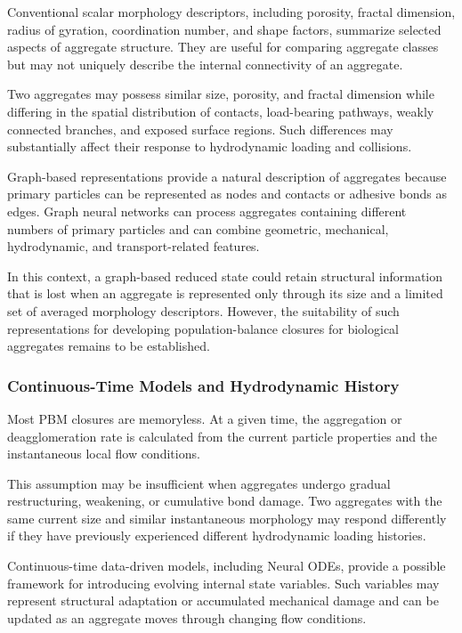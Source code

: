 \documentclass[11pt,a4paper,twoside]{scrartcl}
\begin{document}
Conventional scalar morphology descriptors, including porosity, fractal dimension, radius of gyration, coordination number, and shape factors, summarize selected aspects of aggregate structure. They are useful for comparing aggregate classes but may not uniquely describe the internal connectivity of an aggregate.

Two aggregates may possess similar size, porosity, and fractal dimension while differing in the spatial distribution of contacts, load-bearing pathways, weakly connected branches, and exposed surface regions. Such differences may substantially affect their response to hydrodynamic loading and collisions.

Graph-based representations provide a natural description of aggregates because primary particles can be represented as nodes and contacts or adhesive bonds as edges. Graph neural networks can process aggregates containing different numbers of primary particles and can combine geometric, mechanical, hydrodynamic, and transport-related features.

In this context, a graph-based reduced state could retain structural information that is lost when an aggregate is represented only through its size and a limited set of averaged morphology descriptors. However, the suitability of such representations for developing population-balance closures for biological aggregates remains to be established.

\subsubsection{Continuous-Time Models and Hydrodynamic History}

Most PBM closures are memoryless. At a given time, the aggregation or deagglomeration rate is calculated from the current particle properties and the instantaneous local flow conditions.

This assumption may be insufficient when aggregates undergo gradual restructuring, weakening, or cumulative bond damage. Two aggregates with the same current size and similar instantaneous morphology may respond differently if they have previously experienced different hydrodynamic loading histories.

Continuous-time data-driven models, including Neural ODEs, provide a possible framework for introducing evolving internal state variables. Such variables may represent structural adaptation or accumulated mechanical damage and can be updated as an aggregate moves through changing flow conditions.
\end{document}
